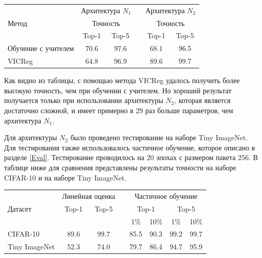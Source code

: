\begin{center}
\begin{tabular}{ l c c c c c } 
  \hline
  \multirow{3}{4em}{Метод} & \multicolumn{2}{c}{Архитектура $N_1$} & & \multicolumn{2}{c}{Архитектура $N_2$} \\
  \cline{2-3}\cline{5-6}

  & \multicolumn{2}{c}{Точность} & & \multicolumn{2}{c}{Точность} \\
  & Top-1 & Top-5 & &  Top-1 & Top-5  \\ 
  \hline

  Обучение с учителем \cite{cifar10} & 70.6 & 97.6 & & 68.1 & 96.5 \\
  VICReg \cite{tiny_imagenet} & 64.8 & 96.9 & & 89.6 & 99.7 \\

  \hline
\end{tabular}
\end{center}

Как видно из таблицы, с помощью метода VICReg удалось получить более высокую точность, чем при обучении с учителем. Но хороший результат получается только при использовании архитектуры $N_2$, которая является достаточно сложной, и имеет примерно в 29 раз больше параметров, чем архитектура $N_1$.

Для архитектуры $N_2$ было проведено тестирование на наборе Tiny ImageNet. Для тестирования также использовалось частичное обучение, которое описано в разделе \ref{Eval}. Тестирование проводилось на 20 эпохах с размером пакета 256. В таблице ниже для сравнения представлены результаты точности на наборе CIFAR-10 и на наборе Tiny ImageNet. 

\begin{center}
\begin{tabular}{ l c c c c c c c } 
  \hline
  \multirow{3}{4em}{Датасет} & \multicolumn{2}{c}{Линейная оценка} & & \multicolumn{4}{c}{Частичное обучение} \\
  \cline{2-3}\cline{5-8}
  
  & Top-1 & Top-5 & &  \multicolumn{2}{c}{Top-1} &  \multicolumn{2}{c}{Top-5}  \\ 
  & & & & 1\% & 10\% & 1\% & 10\% \\ 
  \hline

  CIFAR-10 \cite{cifar10} & 89.6 & 99.7 & & 85.5 & 90.3 & 99.2 & 99.7 \\
  Tiny ImageNet \cite{tiny_imagenet} & 52.3 & 74.0 & & 79.7 & 86.4 & 94.7 & 95.9 \\
  
  \hline
\end{tabular}
\end{center}

